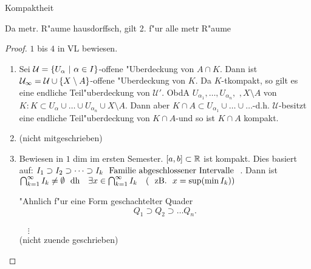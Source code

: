 \documentclass[class=article, crop=false]{standalone}
\begin{document}
\begin{zettel}{Kompaktheit}
\begin{remark}
	Da metr. R"aume hausdorffsch, gilt 2. f"ur alle metr R"aume
\end{remark}
\begin{proof}
	$1$ bis $4$ in VL bewiesen.
	\begin{enumerate}
		\item Sei $\mathcal{U} = \set{U_{\alpha}}{\alpha \in I}$-offene "Uberdeckung von $A
			      \cap K$. Dann ist $\mathcal{U_{1}}= \mathcal{U}\cup \set{X \setminus A}$-offene
		      "Uberdeckung von $K$. Da $K$-tkompakt, so gilt es eine endliche
		      Teil"uberdeckung von $\mathcal{U}'$. ObdA $U_{\alpha_1}, \dots, U_{\alpha_n}, $
		      $,X \setminus A$ von $K: K \subset U_{\alpha} \cup \dots \cup U_{\alpha_{n}}
			      \cup X \setminus A$. Dann aber $K \cap A \subset U_{\alpha_{1}} \cup \dots \cup
			      \dots$-d.h. $\mathcal{U}$-besitzt eine endliche Teil"uberdeckung von $K \cap
			      A$-und so ist $K \cap A $ kompakt.
		\item (nicht mitgeschrieben)
		\item Bewiesen in $1$ dim im ersten Semester. $[a,b] \subset \mathbb{R} $ ist kompakt. Dies
		      basiert auf: $I_1 \supset I_2 \supset \dots \supset I_k \tx{ Familie
				      abgeschlossener Intervalle } $. Dann ist $\bigcap_{k=1}^{\infty} I_k \neq
			      \emptyset \tx{ dh } \exists x \in \bigcap_{k=1}^{\infty} I_k \quad (\tx{ zB. }
			      x =\sup(\min I_k))$

		      "Ahnlich f"ur eine Form geschachtelter Quader
		      \[
			      Q_1 \supset Q_2 \supset \dots Q_n
		      .\]\\
		      $\quad\vdots$ \\
		      (nicht zuende geschrieben)

	\end{enumerate}
\end{proof}
\end{zettel}
\end{document}
